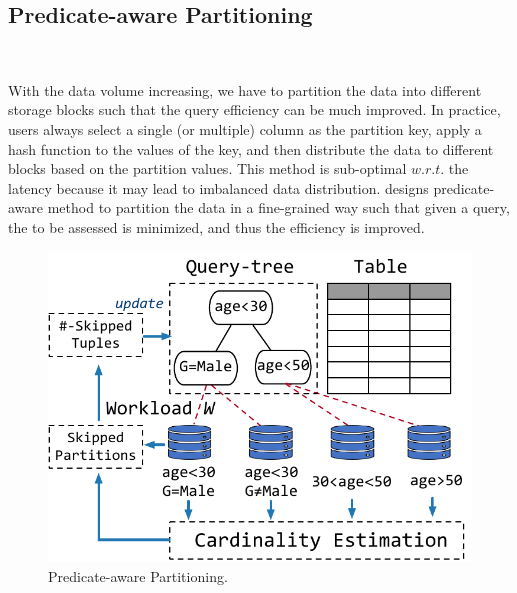 





\subsection{Predicate-aware Partitioning}~\label{subsec:partition}


With the data volume increasing, we  have to partition the data into different storage blocks such that the query efficiency can be much improved. In practice, users always select a single (or multiple) column as the partition key,  apply   a hash function to the values of the key, and then distribute the data to different blocks based on the partition values. This method is sub-optimal $w.r.t.$ the latency because it may lead to imbalanced data distribution. \brain  designs predicate-aware  method to partition the data in a fine-grained way such that given a query, the  to be assessed is minimized, and thus the efficiency is improved.


\begin{figure}[htbp]
	\includegraphics[scale=0.6]{figures/partition}
	\centering
	\vspace{-1em}
	\caption{Predicate-aware Partitioning.}
	\label{fig:partition}
	\vspace{-1em}
\end{figure}



